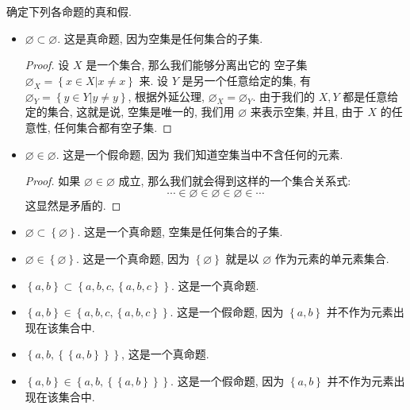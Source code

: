 \documentclass[10pt,UTF8]{book} %
\begin{document}
\begin{exercise}
    确定下列各命题的真和假.
    \begin{itemize}[itemsep=0pt]
        \item $\varnothing \subset \varnothing$. 这是真命题,
        因为空集是任何集合的子集.
        \begin{proof}
        设 $X$ 是一个集合, 那么我们能够分离出它的
        空子集 $\varnothing_X = \left\{ x \in X | x \ne x \right\}$ 来.
        设 $Y$ 是另一个任意给定的集, 有 $\varnothing_Y = \left\{ y \in Y |
        y \ne y \right\}$, 根据外延公理, $\varnothing_X = \varnothing_Y$.
        由于我们的 $X,Y$ 都是任意给定的集合, 这就是说, 空集是唯一的, 我们用 $\varnothing$
        来表示空集, 并且, 由于 $X$ 的任意性, 任何集合都有空子集.
        \end{proof}
        \item $\varnothing \in \varnothing$. 这是一个假命题, 因为
        我们知道空集当中不含任何的元素.
        \begin{proof}
            如果 $\varnothing \in \varnothing$ 成立,
            那么我们就会得到这样的一个集合关系式:
            \[ \cdots \in \varnothing \in \varnothing \in \varnothing \in \cdots \]
            这显然是矛盾的.
        \end{proof}
        \item $\varnothing \subset \left\{ \varnothing \right\}$.
        这是一个真命题, 空集是任何集合的子集.
        \item $\varnothing \in \left\{\varnothing\right\}$.
        这是一个真命题, 因为 $\left\{ \varnothing \right\}$
        就是以 $\varnothing$ 作为元素的单元素集合.
        \item $\left\{a,b\right\} \subset \left\{
            a,b,c, \left\{ a,b,c \right\}
        \right\}$. 这是一个真命题.
        \item $\left\{ a,b \right\} \in \left\{
            a,b,c, \left\{ a,b,c \right\}
        \right\}$. 这是一个假命题, 因为 $\left\{a,b\right\}$
        并不作为元素出现在该集合中.
        \item $\left\{ a,b, \left\{ \left\{a,b\right\} \right\} \right\}$,
        这是一个真命题.
        \item $\left\{ a,b \right\} \in \left\{
            a,b, \left\{ \left\{
                a,b
            \right\} \right\}
        \right\}$. 这是一个假命题, 因为 $\left\{a,b\right\}$
        并不作为元素出现在该集合中.
    \end{itemize}
\end{exercise}
\end{document}
